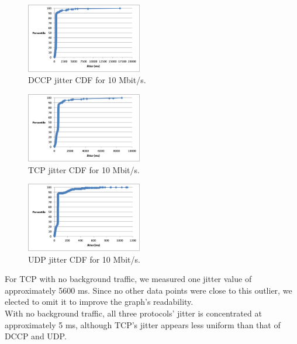 \documentclass[9pt,twocolumn]{article}
\begin{document}
\begin{figure}[h]
   \centering
      \includegraphics[width=0.45\textwidth]{pics/dccp_10_jitter_new}
   \caption{DCCP jitter CDF for 10 Mbit/s.}
\label{fig:dccp_10_jitter}
\end{figure}

\begin{figure}[h]
   \centering
      \includegraphics[width=0.45\textwidth]{pics/tcp_10_jitter}
   \caption{TCP jitter CDF for 10 Mbit/s.}
\label{fig:tcp_10_jitter}
\end{figure}

\begin{figure}[h]
   \centering
      \includegraphics[width=0.45\textwidth]{pics/udp_10_jitter}
   \caption{UDP jitter CDF for 10 Mbit/s.}
\label{fig:udp_10_jitter}
\end{figure}

For TCP with no background traffic, we measured one jitter value of
approximately 5600 ms. Since no other data points were close to this outlier, we
elected to omit it to improve the graph's readability.\\

With no background traffic, all three protocols' jitter is concentrated at
approximately 5 ms, although TCP's jitter appears less uniform than that of DCCP
and UDP.\\
\end{document}
